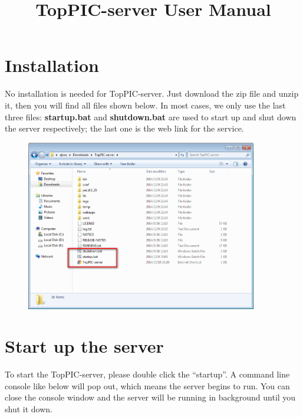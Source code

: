 \documentclass[12pt,letterpaper]{article}
\begin{document}
\title{TopPIC-server User Manual}

\author{}

\date{}

\maketitle


\section{Installation}

No installation is needed for TopPIC-server. 
Just download the zip file and unzip it, then you will find
all files shown below. In most cases, we only use the last three files:
\textbf{startup.bat} and \textbf{shutdown.bat} are used to start up and shut down
the server respectively; the last one is the web link for the service.

\begin{figure}[H]
\begin{center}
    \includegraphics[width=0.9\textwidth]{fig/2.png}
\end{center}
\end{figure}

\section{Start up the server}

To start the TopPIC-server, please double click the ``startup''.
A command line console like below will pop out, 
which means the server begins to run.
You can close the console window and the server will be running in background
until you shut it down.
\end{document}
